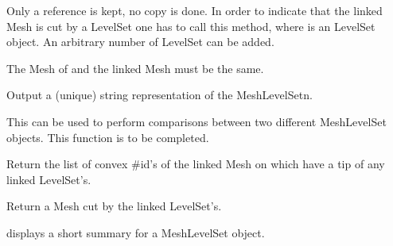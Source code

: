 \documentclass[a4paper,11pt,english]{sphinxmanual}
\begin{document}
\begin{fulllineitems}
\begin{fulllineitems}
Only a reference is kept, no copy is done. In order to indicate
that the linked Mesh is cut by a LevelSet one has to call this
method, where  is an LevelSet object. An arbitrary number of
LevelSet can be added.


The Mesh of  and the linked Mesh must be the same.

\end{fulllineitems}


\begin{fulllineitems}
\label{\detokenize{python/cmdref_MeshLevelSet:getfem.MeshLevelSet.char}}
Output a (unique) string representation of the MeshLevelSetn.

This can be used to perform comparisons between two
different MeshLevelSet objects.
This function is to be completed.

\end{fulllineitems}


\begin{fulllineitems}
\label{\detokenize{python/cmdref_MeshLevelSet:getfem.MeshLevelSet.crack_tip_convexes}}
Return the list of convex \#id’s of the linked Mesh on
which have a tip of any linked LevelSet’s.

\end{fulllineitems}


\begin{fulllineitems}
\label{\detokenize{python/cmdref_MeshLevelSet:getfem.MeshLevelSet.cut_mesh}}
Return a Mesh cut by the linked LevelSet’s.

\end{fulllineitems}


\begin{fulllineitems}
\label{\detokenize{python/cmdref_MeshLevelSet:getfem.MeshLevelSet.display}}
displays a short summary for a MeshLevelSet object.


\end{fulllineitems}
\end{fulllineitems}
\end{document}
